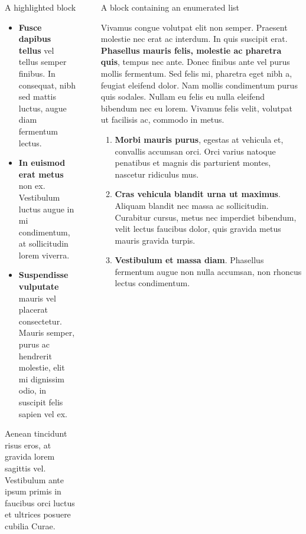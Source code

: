\documentclass[final]{beamer}
\newlength{\sepwidth}
\newlength{\colwidth}
\newcommand{\separatorcolumn}{\begin{column}{\sepwidth}\end{column}}
\begin{document}
\begin{frame}[t]
\begin{columns}[t]
\begin{column}{\colwidth}
\begin{alertblock}{A highlighted block}
    \begin{itemize}
      \item \textbf{Fusce dapibus tellus} vel tellus semper finibus. In
        consequat, nibh sed mattis luctus, augue diam fermentum lectus.
      \item \textbf{In euismod erat metus} non ex. Vestibulum luctus augue in
        mi condimentum, at sollicitudin lorem viverra.
      \item \textbf{Suspendisse vulputate} mauris vel placerat consectetur.
        Mauris semper, purus ac hendrerit molestie, elit mi dignissim odio, in
        suscipit felis sapien vel ex.
    \end{itemize}

    Aenean tincidunt risus eros, at gravida lorem sagittis vel. Vestibulum ante
    ipsum primis in faucibus orci luctus et ultrices posuere cubilia Curae.

  \end{alertblock}

\end{column}

\separatorcolumn

\begin{column}{\colwidth}

  \begin{block}{A block containing an enumerated list}

    Vivamus congue volutpat elit non semper. Praesent molestie nec erat ac
    interdum. In quis suscipit erat. \textbf{Phasellus mauris felis, molestie
    ac pharetra quis}, tempus nec ante. Donec finibus ante vel purus mollis
    fermentum. Sed felis mi, pharetra eget nibh a, feugiat eleifend dolor. Nam
    mollis condimentum purus quis sodales. Nullam eu felis eu nulla eleifend
    bibendum nec eu lorem. Vivamus felis velit, volutpat ut facilisis ac,
    commodo in metus.

    \begin{enumerate}
      \item \textbf{Morbi mauris purus}, egestas at vehicula et, convallis
        accumsan orci. Orci varius natoque penatibus et magnis dis parturient
        montes, nascetur ridiculus mus.
      \item \textbf{Cras vehicula blandit urna ut maximus}. Aliquam blandit nec
        massa ac sollicitudin. Curabitur cursus, metus nec imperdiet bibendum,
        velit lectus faucibus dolor, quis gravida metus mauris gravida turpis.
      \item \textbf{Vestibulum et massa diam}. Phasellus fermentum augue non
        nulla accumsan, non rhoncus lectus condimentum.
    \end{enumerate}


\end{block}
\end{column}
\end{columns}
\end{frame}
\end{document}
